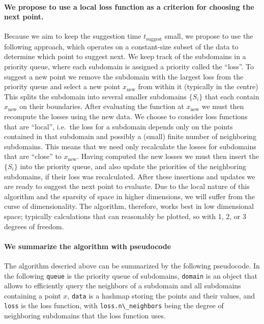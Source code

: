 \documentclass[english, twocolumn, 10pt, aps, superscriptaddress, floatfix, prb, citeautoscript]{revtex4-1}
\newcommand{\passthrough}[1]{\lstset{mathescape=false}#1\lstset{mathescape=true}}
\begin{document}
\paragraph{We propose to use a local loss function as a criterion for choosing the next point.}

Because we aim to keep the suggestion time \(t_\textrm{suggest}\) small, we propose to use the following approach, which operates on a constant-size subset of the data to determine which point to suggest next.
We keep track of the subdomains in a priority queue, where each subdomain is assigned a priority called the ``loss''.
To suggest a new point we remove the subdomain with the largest loss from the priority queue and select a new point \(x_\textrm{new}\) from within it (typically in the centre)
This splits the subdomain into several smaller subdomains \(\{S_i\}\) that each contain \(x_\textrm{new}\) on their boundaries.
After evaluating the function at \(x_\textrm{new}\) we must then recompute the losses using the new data.
We choose to consider loss functions that are ``local'', i.e.~the loss for a subdomain depends only on the points contained in that subdomain and possibly a (small) finite number of neighboring subdomains.
This means that we need only recalculate the losses for subdomains that are ``close'' to \(x_\textrm{new}\).
Having computed the new losses we must then insert the \(\{S_i\}\) into the priority queue, and also update the priorities of the neighboring subdomains, if their loss was recalculated.
After these insertions and updates we are ready to suggest the next point to evaluate.
Due to the local nature of this algorithm and the sparsity of space in higher dimensions, we will suffer from the curse of dimensionality.
The algorithm, therefore, works best in low dimensional space; typically calculations that can reasonably be plotted, so with 1, 2, or 3 degrees of freedom.

\paragraph{We summarize the algorithm with pseudocode}

The algorithm descried above can be summarized by the following pseudocode.
In the following \passthrough{\lstinline!queue!} is the priority queue of subdomains, \passthrough{\lstinline!domain!} is an object that allows to efficiently query the neighbors of a subdomain and all subdomains containing a point \(x\), \passthrough{\lstinline!data!} is a hashmap storing the points and their values, and \passthrough{\lstinline!loss!} is the loss function, with \passthrough{\lstinline!loss.n\_neighbors!} being the degree of neighboring subdomains that the loss function uses.
\end{document}
